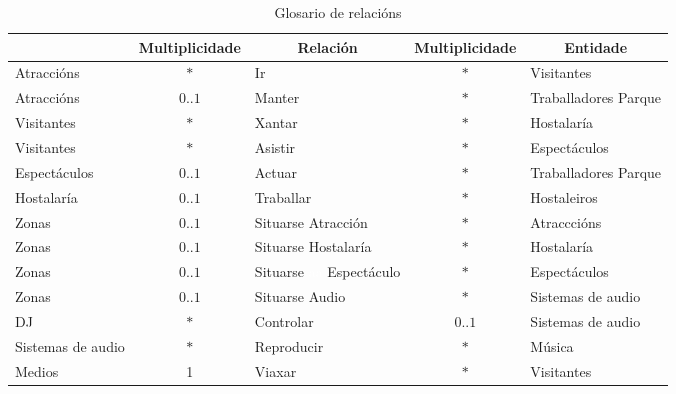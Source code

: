 \documentclass[12pt,a4paper]{book}
\theoremstyle{definition}
\theoremstyle{break}
\begin{document}
	\newpage
	
	\begin{table} [H] \centering
		\caption{Glosario de relacións}
		\begin{tabular}{|m{2.3cm}|c|m{2.05cm}|c|m{2.4cm}|}
			\hline \rowcolor{gris}
			\multicolumn{1}{|c|}{Entidade} & \multicolumn{1}{c|}{Multiplicidade} & \multicolumn{1}{c|}{Relación} & \multicolumn{1}{c|}{Multiplicidade} & \multicolumn{1}{c|}{Entidade} \\
			\hline
			Atraccións & $*$ & Ir & $*$ & Visitantes \\
			\hline
			Atraccións & $0$..$1$ & Manter & $*$ & Traballadores Parque \\
			\hline
			Visitantes & $*$ & Xantar & $*$ & Hostalaría \\
			\hline
			Visitantes & $*$ & Asistir & $*$ & Espectáculos \\
			\hline
			Espectáculos & $0$..$1$ & Actuar & $*$ & Traballadores Parque \\
			\hline
			Hostalaría & $0$..$1$ & Traballar & $*$ & Hostaleiros \\
			\hline
			Zonas & $0$..$1$ & Situarse Atracción & $*$ & Atracccións\\
			\hline
			Zonas & $0$..$1$ & Situarse Hostalaría & $*$ & Hostalaría\\
			\hline
			Zonas & $0$..$1$ & Situarse \textcolor{white}{aa} Espectáculo & $*$ & Espectáculos\\
			\hline
			Zonas & $0$..$1$ & Situarse Audio & $*$ & Sistemas de audio\\
			\hline
			DJ & $*$ & Controlar & $0$..$1$ & Sistemas de audio\\
			\hline
			Sistemas de audio & $*$ & Reproducir & $*$ & Música\\
			\hline
			Medios & 1 & Viaxar & $*$& Visitantes\\
			\hline
		\end{tabular}
	\end{table}
	
	
	\newpage
	
\end{document}
